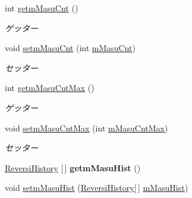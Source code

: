 \begin{DoxyCompactItemize}
int \hyperlink{classjp_1_1gr_1_1java__conf_1_1yuta__yoshinaga_1_1reversi_1_1model_1_1_reversi_a9ee4f16f9fedcea48c44f81e8ad73f81}{getm\+Masu\+Cnt} ()
\begin{DoxyCompactList}\small\item\em ゲッター \end{DoxyCompactList}\item 
void \hyperlink{classjp_1_1gr_1_1java__conf_1_1yuta__yoshinaga_1_1reversi_1_1model_1_1_reversi_a71ae120574f664807065c0ec033bbdb7}{setm\+Masu\+Cnt} (int \hyperlink{classjp_1_1gr_1_1java__conf_1_1yuta__yoshinaga_1_1reversi_1_1model_1_1_reversi_a3f097d8e3fb0640bb036fd6973b48a9c}{m\+Masu\+Cnt})
\begin{DoxyCompactList}\small\item\em セッター \end{DoxyCompactList}\item 
int \hyperlink{classjp_1_1gr_1_1java__conf_1_1yuta__yoshinaga_1_1reversi_1_1model_1_1_reversi_a1991b683bec4721f4228a262423790a9}{getm\+Masu\+Cnt\+Max} ()
\begin{DoxyCompactList}\small\item\em ゲッター \end{DoxyCompactList}\item 
void \hyperlink{classjp_1_1gr_1_1java__conf_1_1yuta__yoshinaga_1_1reversi_1_1model_1_1_reversi_a7922e78f289073783772fa9c18e7d00a}{setm\+Masu\+Cnt\+Max} (int \hyperlink{classjp_1_1gr_1_1java__conf_1_1yuta__yoshinaga_1_1reversi_1_1model_1_1_reversi_a8df437cc86b73f45ed804515299abf98}{m\+Masu\+Cnt\+Max})
\begin{DoxyCompactList}\small\item\em セッター \end{DoxyCompactList}\item 
\mbox{\label{classjp_1_1gr_1_1java__conf_1_1yuta__yoshinaga_1_1reversi_1_1model_1_1_reversi_a1eb3b4e7ab6a93ee09fc486c088011a3}} 
\hyperlink{classjp_1_1gr_1_1java__conf_1_1yuta__yoshinaga_1_1reversi_1_1model_1_1_reversi_history}{Reversi\+History} \mbox{[}$\,$\mbox{]} {\bfseries getm\+Masu\+Hist} ()
\item 
void \hyperlink{classjp_1_1gr_1_1java__conf_1_1yuta__yoshinaga_1_1reversi_1_1model_1_1_reversi_a7eb4166a2fc23f8ed9451a7b35c8d342}{setm\+Masu\+Hist} (\hyperlink{classjp_1_1gr_1_1java__conf_1_1yuta__yoshinaga_1_1reversi_1_1model_1_1_reversi_history}{Reversi\+History}\mbox{[}$\,$\mbox{]} \hyperlink{classjp_1_1gr_1_1java__conf_1_1yuta__yoshinaga_1_1reversi_1_1model_1_1_reversi_a46c98da5c26ea321dc380380972b7aa1}{m\+Masu\+Hist})

\end{DoxyCompactItemize}

